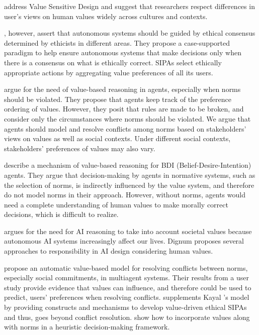 \citet{Borning-CHI2012-VSD} address Value Sensitive Design and suggest that researchers respect differences in user's views on human values widely across cultures and contexts. 

\citet{anderson-2015-ethical}, however, assert that autonomous systems should be guided by ethical consensus determined by ethicists in different areas. They propose a case-supported paradigm to help ensure autonomous systems that make decisions only when there is a consensus on what is ethically correct. \frameworkAinur SIPAs select ethically appropriate actions by aggregating value preferences of all its users.

\citet{Bench-Capon-ail2017} argue for the need of value-based reasoning in agents, especially when norms should be violated. They propose that agents keep track of the preference ordering of values. However, they posit that rules are made to be broken, and consider only the circumstances where norms should be violated. We argue that agents should model and resolve conflicts among norms based on stakeholders' views on values as well as social contexts. Under different social contexts, stakeholders' preferences of values may also vary. 

\citet{Cranefield-ijcai17-value+bdi} describe a mechanism of value-based reasoning for BDI (Belief-Desire-Intention) agents. They argue that decision-making by agents in normative systems, such as the selection of norms, is indirectly influenced by the value system, and therefore do not model norms in their approach. 
However, without norms, agents would need a complete understanding of human values to make morally correct decisions, which is difficult to realize. 

\citet{dignum-ijcai17-responsible} argues for the need for AI reasoning to take into account societal values because autonomous AI systems increasingly affect our lives. Dignum proposes several approaches to responsibility in AI design considering human values. 

\citet{Kayal-TOIT18} propose an automatic value-based model for resolving conflicts between norms, especially social commitments, in multiagent systems. Their results from a user study provide evidence that values can influence, and therefore could be used to predict, users' preferences when resolving conflicts. \frameworkAinur supplements Kayal {\etal}'s model by providing constructs and mechanisms to develop value-driven ethical SIPAs and thus, goes beyond conflict resolution. 
\citet{Serramia+18:values} show how to incorporate values along with norms in a heuristic decision-making framework.

